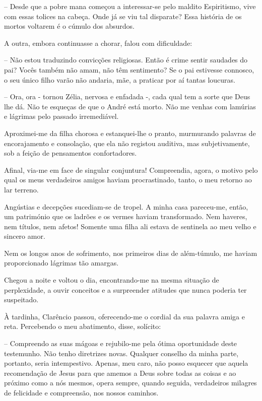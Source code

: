 \documentclass[portuguese,12pt,a4paper]{scrbook}
\begin{document}
	
	– Desde que a pobre mana começou a interessar-se pelo maldito Espiritismo, vive com essas tolices na cabeça. Onde já se viu tal disparate? Essa história de os mortos voltarem é o cúmulo dos absurdos.
	
	A outra, embora continuasse a chorar, falou com dificuldade:
	
	– Não estou traduzindo convicções religiosas. Então é crime sentir saudades do pai? Vocês também não amam, não têm sentimento? Se o pai estivesse connosco, o seu único filho varão não andaria, mãe, a praticar por aí tantas loucuras.
	
	– Ora, ora - tornou Zélia, nervosa e enfadada -, cada qual tem a sorte que Deus lhe dá. Não te esqueças de que o André está morto. Não me venhas com lamúrias e lágrimas pelo passado irremediável.
	
	Aproximei-me da filha chorosa e estanquei-lhe o pranto, murmurando palavras de encorajamento e consolação, que ela não registou auditiva, mas subjetivamente, sob a feição de pensamentos confortadores.
	
	Afinal, via-me em face de singular conjuntura! Compreendia, agora, o motivo pelo qual os meus verdadeiros amigos haviam procrastinado, tanto, o meu retorno ao lar terreno.
	
	Angústias e decepções sucediam-se de tropel. A minha casa pareceu-me, então, um património que os ladrões e os vermes haviam transformado. Nem haveres, nem títulos, nem afetos! Somente uma filha ali estava de sentinela ao meu velho e sincero amor.
	
	Nem os longos anos de sofrimento, nos primeiros dias de além-túmulo, me haviam proporcionado lágrimas tão amargas.
	
	Chegou a noite e voltou o dia, encontrando-me na mesma situação de perplexidade, a ouvir conceitos e a surpreender atitudes que nunca poderia ter suspeitado.
	
	
	À tardinha, Clarêncio passou, oferecendo-me o cordial da sua palavra amiga e reta. Percebendo o meu abatimento, disse, solícito:
	
	– Compreendo as suas mágoas e rejubilo-me pela ótima oportunidade deste testemunho. Não tenho diretrizes novas. Qualquer conselho da minha parte, portanto, seria intempestivo. Apenas, meu caro, não posso esquecer que aquela recomendação de Jesus para que amemos a Deus sobre todas as coisas e ao próximo como a nós mesmos, opera sempre, quando seguida, verdadeiros milagres de felicidade e compreensão, nos nossos caminhos.
	
\end{document}
